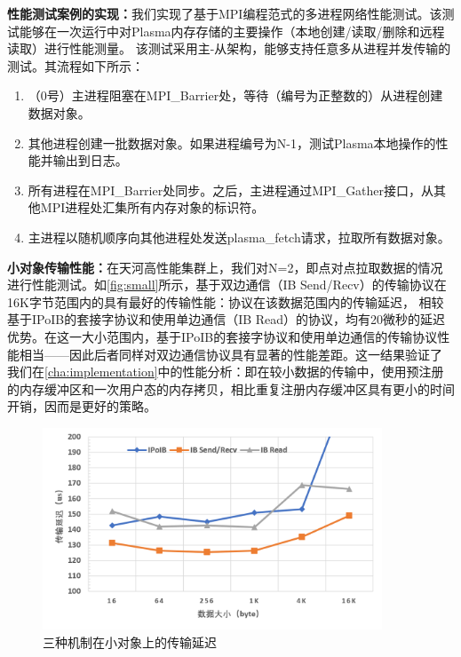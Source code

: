 \textbf{性能测试案例的实现：}我们实现了基于MPI编程范式的多进程网络性能测试。该测试能够在一次运行中对Plasma内存存储的主要操作（本地创建/读取/删除和远程读取）进行性能测量。
该测试采用主-从架构，能够支持任意多从进程并发传输的测试。其流程如下所示：

\begin{enumerate}
	\item （0号）主进程阻塞在MPI\_Barrier处，等待（编号为正整数的）从进程创建数据对象。
	\item 其他进程创建一批数据对象。如果进程编号为N-1，测试Plasma本地操作的性能并输出到日志。
	\item 所有进程在MPI\_Barrier处同步。之后，主进程通过MPI\_Gather接口，从其他MPI进程处汇集所有内存对象的标识符。
	\item 主进程以随机顺序向其他进程处发送plasma\_fetch请求，拉取所有数据对象。
\end{enumerate}

\textbf{小对象传输性能：}在天河高性能集群上，我们对N=2，即点对点拉取数据的情况进行性能测试。如\autoref{fig:small}所示，基于双边通信（IB Send/Recv）的传输协议在16K字节范围内的具有最好的传输性能：协议在该数据范围内的传输延迟，
相较基于IPoIB的套接字协议和使用单边通信（IB Read）的协议，均有20微秒的延迟优势。在这一大小范围内，基于IPoIB的套接字协议和使用单边通信的传输协议性能相当——因此后者同样对双边通信协议具有显著的性能差距。这一结果验证了
我们在\autoref{cha:implementation}中的性能分析：即在较小数据的传输中，使用预注册的内存缓冲区和一次用户态的内存拷贝，相比重复注册内存缓冲区具有更小的时间开销，因而是更好的策略。

\begin{figure}[h]
	\centering
	\includegraphics[width=0.9\textwidth]{image/chap04/small.png}
	\caption{三种机制在小对象上的传输延迟}
	\label{fig:small}
\end{figure}

